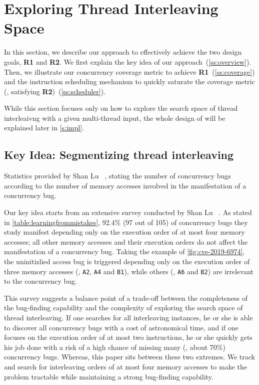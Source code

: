 \section{Exploring Thread Interleaving Space}
\label{s:design}

In this section, we describe our approach to effectively achieve the
two design goals, \textbf{R1} and \textbf{R2}.
%
We first explain the key idea of our
approach~(\autoref{ss:overview}). Then, we illustrate our concurrency
coverage metric to achieve \textbf{R1}~(\autoref{ss:coverage}) and the
instruction scheduling mechanism to quickly saturate the coverage
metric (\eg, satisfying \textbf{R2})~(\autoref{ss:scheduler}).


While this section focuses only on how to explore the search space of
thread interleaivng with a given multi-thread input, the whole design
of \sys will be explained later in \autoref{s:impl}.


\subsection{Key Idea: Segmentizing thread interleaving}
\label{ss:overview}


\begin{table}[t]
  \centering
  
  \caption{Statistics provided by Shan Lu
    \etal~\cite{learningfrommistakes}, stating the number of
    concurrency bugs according to the number of memory accesses
    involved in the manifestation of a concurrency bug.}
  \label{table:learningfrommistakes}
\end{table}

Our key idea starts from an extensive survey conducted by Shan Lu
\etal~\cite{learningfrommistakes}.
%
As stated in \autoref{table:learningfrommistakes}, 92.4\% (97 out of
105) of concurrency bugs they study manifest depending only on the
execution order of at most four memory accesses; all other memory
accesses and their execution orders do not affect the manifestation of
a concurrency bug.
%
Taking the example of \autoref{fig:cve-2019-6974}, the uninitizlied
access bug is triggered depending only on the execution order of three
memory accesses (\eg, \texttt{A2}, \texttt{A4} and \texttt{B1}), while
others (\eg, \texttt{A6} and \texttt{B2}) are irrelevant to the
concurrency bug.


This survey suggests a balance point of a trade-off between the
completeness of the bug-finding capability and the complexity of
exploring the search space of thread interleaving.
%
If one searches for all interleaving instances, he or she is able to
discover all concurrency bugs with a cost of astronomical time, and
if one focuses on the execution order of at most two instructions, he
or she quickly gets his job done with a risk of a high chance of
missing many (\eg, about 70\%) concurrency bugs.
%
Whereas, this paper sits between these two extremes. We track and
search for interleaving orders of at most four memory accesses to make
the problem tractable while maintaining a strong bug-finding
capability.



